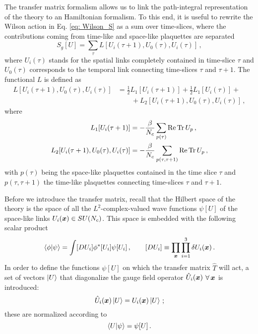\documentclass{article}
\begin{document}
The transfer matrix formalism allows us to link the path-integral representation of the theory to an Hamiltonian formalism. To this end, it is useful to rewrite the Wilson action in Eq. \eqref{eq: Wilson_S} as a sum over time-slices, where the contributions coming from time-like and space-like plaquettes are separated \cite{Montvay:1994cy}
\begin{equation}
    S_g[U] = \sum_\tau L[U_i(\tau+1), U_0(\tau), U_i(\tau)] \, ,
\end{equation}
where $U_i(\tau)$ stands for the spatial links completely contained in time-slice $\tau$ and $U_0(\tau)$ corresponds to the temporal link connecting time-slices $\tau$ and $\tau+1$. The functional $L$ is defined as
\begin{equation}
    \begin{aligned}
        L[U_i(\tau+1), U_0(\tau), U_i(\tau)] &= \frac{1}{2} L_1[U_i(\tau+1)] + \frac{1}{2} L_1[U_i(\tau)] + \\
        &\qquad +L_2[U_i(\tau+1), U_0(\tau), U_i(\tau)] \, , 
    \end{aligned}
\end{equation}
where
\begin{align}
    L_1[U_i(\tau+1)] &= -\frac{\beta}{N_c} \sum_{p(\tau)} \Re \Tr U_p \, , \\
    L_2[U_i(\tau+1), U_0(\tau), U_i(\tau)] &= -\frac{\beta}{N_c} \sum_{p(\tau, \tau+1)} \Re \Tr U_p \, ,
\end{align}
with $p(\tau)$ being the space-like plaquettes contained in the time slice $\tau$ and $p(\tau, \tau+1)$ the time-like plaquettes connecting time-slices $\tau$ and $\tau+1$. 

Before we introduce the transfer matrix, recall that the Hilbert space of the theory is the space of all the $L^2$-complex-valued wave functions $\psi[U]$ of the space-like links $U_i(\vb*{x}) \in SU(N_c)$\cite{Della_Morte_2009}. This space is embedded with the following scalar product
\begin{equation}
    \braket{\phi}{\psi} = \int [D U_i] \phi^* [U_i] \psi[U_i] \, , \qquad [D U_i] \equiv \prod_{\vb*{x}} \prod_{i=1}^3 \delta U_i(\vb*{x}) \, .
\end{equation}
In order to define the functions $\psi[U]$ on which the transfer matrix $\hat{T}$ will act, a set of vectors $\ket{U}$ that diagonalize the gauge field operator $\hat{U}_i(\vb*{x})$ $\forall \, \vb*{x}$ is introduced:
\begin{equation}
    \hat{U}_i(\vb*{x}) \ket{U} = U_i(\vb*{x}) \ket{U} \, ;
\end{equation}
these are normalized according to
\begin{equation}
    \braket{U}{\psi} = \psi[U] \, .
\end{equation}




\printbibliography
\end{document}
